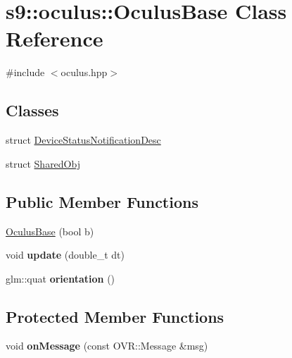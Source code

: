 \hypertarget{classs9_1_1oculus_1_1OculusBase}{\section{s9\-:\-:oculus\-:\-:\-Oculus\-Base \-Class \-Reference}
\label{classs9_1_1oculus_1_1OculusBase}
}


{\ttfamily \#include $<$oculus.\-hpp$>$}

\subsection*{\-Classes}
\begin{DoxyCompactItemize}
\item 
struct \hyperlink{structs9_1_1oculus_1_1OculusBase_1_1DeviceStatusNotificationDesc}{\-Device\-Status\-Notification\-Desc}
\item 
struct \hyperlink{structs9_1_1oculus_1_1OculusBase_1_1SharedObj}{\-Shared\-Obj}
\end{DoxyCompactItemize}
\subsection*{\-Public \-Member \-Functions}
\begin{DoxyCompactItemize}
\item 
\hyperlink{classs9_1_1oculus_1_1OculusBase_a574e05f1890877cd2eb77f8fbbd9c553}{\-Oculus\-Base} (bool b)
\item 
\hypertarget{classs9_1_1oculus_1_1OculusBase_a27692440805e1d7d2703a4e6888d4b80}{void {\bfseries update} (double\-\_\-t dt)}\label{classs9_1_1oculus_1_1OculusBase_a27692440805e1d7d2703a4e6888d4b80}

\item 
\hypertarget{classs9_1_1oculus_1_1OculusBase_aefe5b29e90ed850e13c659afcae4c2b1}{glm\-::quat {\bfseries orientation} ()}\label{classs9_1_1oculus_1_1OculusBase_aefe5b29e90ed850e13c659afcae4c2b1}

\end{DoxyCompactItemize}
\subsection*{\-Protected \-Member \-Functions}
\begin{DoxyCompactItemize}
\item 
\hypertarget{classs9_1_1oculus_1_1OculusBase_ae907d2afb62302ecc58b10736112400f}{void {\bfseries on\-Message} (const \-O\-V\-R\-::\-Message \&msg)}\label{classs9_1_1oculus_1_1OculusBase_ae907d2afb62302ecc58b10736112400f}

\end{DoxyCompactItemize}
